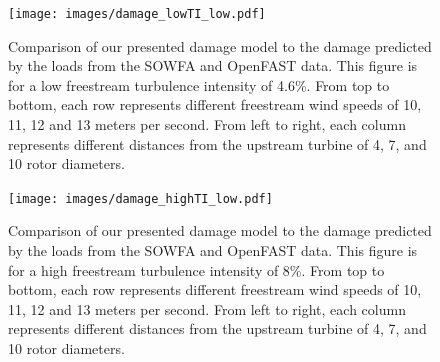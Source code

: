 \documentclass[11pt,letterpaper]{article}
\providecommand{\DIFaddbeginFL}{} %
\providecommand{\DIFaddendFL}{} %
\providecommand{\DIFdelbeginFL}{} %
\providecommand{\DIFdelendFL}{} %
\newcommand{\DIFscaledelfig}{0.5}
\newlength{\DIFdelgraphicswidth} %
\newlength{\DIFdelgraphicsheight} %
\newcommand{\DIFaddincludegraphics}[2][]{{\color{blue}\fbox{\DIFOincludegraphics[#1]{#2}}}} %
\newcommand{\DIFdelincludegraphics}[2][]{%
\sbox{\DIFdelgraphicsbox}{\DIFOincludegraphics[#1]{#2}}%
\settoboxwidth{\DIFdelgraphicswidth}{\DIFdelgraphicsbox} %
\settoboxtotalheight{\DIFdelgraphicsheight}{\DIFdelgraphicsbox} %
\scalebox{\DIFscaledelfig}{%
\parbox[b]{\DIFdelgraphicswidth}{\usebox{\DIFdelgraphicsbox}\\[-\baselineskip] \rule{\DIFdelgraphicswidth}{0em}}\llap{\resizebox{\DIFdelgraphicswidth}{\DIFdelgraphicsheight}{%
\setlength{\unitlength}{\DIFdelgraphicswidth}%
\begin{picture}(1,1)%
\thicklines\linethickness{2pt} %
{\color[rgb]{1,0,0}\put(0,0){\framebox(1,1){}}}%
{\color[rgb]{1,0,0}\put(0,0){\line( 1,1){1}}}%
{\color[rgb]{1,0,0}\put(0,1){\line(1,-1){1}}}%
\end{picture}%
}\hspace*{3pt}}} %
} %
\DeclareRobustCommand{\DIFaddbeginFL}{\DIFOaddbeginFL \let\includegraphics\DIFaddincludegraphics} %
\DeclareRobustCommand{\DIFaddendFL}{\DIFOaddendFL \let\includegraphics\DIFOincludegraphics} %
\DeclareRobustCommand{\DIFdelbeginFL}{\DIFOdelbeginFL \let\includegraphics\DIFdelincludegraphics} %
\DeclareRobustCommand{\DIFdelendFL}{\DIFOaddendFL \let\includegraphics\DIFOincludegraphics} %
\begin{document}
% 
\begin{figure}
    \centering
    \DIFdelbeginFL %
\DIFdelendFL \DIFaddbeginFL \texttt{[image: images/damage\_lowTI\_low.pdf]}
    \DIFaddendFL \caption{Comparison of our presented damage model to the damage predicted by the loads from the SOWFA and OpenFAST data. This figure is for a low freestream turbulence intensity of 4.6\%. From top to bottom, each row represents different freestream wind speeds of 10, 11, 12 and 13 meters per second. From left to right, each column represents different distances from the upstream turbine of 4, 7, and 10 rotor diameters.}
    \label{low_TI}
\end{figure}
% 
\begin{figure}
    \centering
    \DIFdelbeginFL %
\DIFdelendFL \DIFaddbeginFL \texttt{[image: images/damage\_highTI\_low.pdf]}
    \DIFaddendFL \caption{Comparison of our presented damage model to the damage predicted by the loads from the SOWFA and OpenFAST data. This figure is for a high freestream turbulence intensity of 8\%. From top to bottom, each row represents different freestream wind speeds of 10, 11, 12 and 13 meters per second. From left to right, each column represents different distances from the upstream turbine of 4, 7, and 10 rotor diameters.}
    \label{high_TI}
\end{figure}
\end{document}
